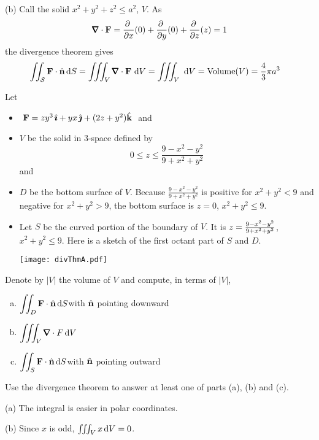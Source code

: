 \begin{solution}
(b) Call the solid $x^2+y^2+z^2\le a^2$, $V$.
As
\begin{equation*}
\vnabla\cdot\vF
=\pdiff{}{x}(0)
+\pdiff{}{y}(0)
+\pdiff{}{z}(z)
=1
\end{equation*}
the divergence theorem gives
\begin{align*}
\dblInt_{\cS}\vF\cdot\hn\,\dee{S}
&=\tripInt_V\vnabla\cdot\vF\ \dee{V}
=\tripInt_V \ \dee{V}
=\text{Volume}(V)
=\frac{4}{3}\pi a^3
\end{align*}
\end{solution}

\begin{question}
 Let 
\begin{itemize}\itemsep1pt \parskip0pt  %
\item
$\ \vF=zy^3\,\hi+yx\, \hj+(2z+y^2)\hk\ $ and
\item
 $V$ be the solid in 3-space defined by
$$
0\le z\le \frac{9-x^2-y^2}{9+x^2+y^2}
$$
and
\item
$D$ be the bottom surface of $V$.
Because $\frac{9-x^2-y^2}{9+x^2+y^2}$ is positive for 
$x^2+y^2< 9$ and negative for $x^2+y^2> 9$,
the bottom surface is $z=0$, $x^2+y^2\le 9$.
\item
Let $S$ be the curved portion of the boundary of $V$.
It is $z={9-x^2-y^2\over 9+x^2+y^2}$, $x^2+y^2\le 9$.
Here is a sketch of the first octant part of $S$ and $D$.
\begin{center}
       \texttt{[image: divThmA.pdf]}
\end{center}
\end{itemize}
Denote by $|V|$ the volume of $V$ and compute, in terms of $|V|$,
\begin{enumerate}[(a)]
\item
$\displaystyle\iint_{D}\mathbf{F}\cdot \hat{\mathbf{n}}\,\mathrm{d}S$\quad\quad with $\hat{\mathbf{n}}$ pointing downward
\item
$\dst\tripInt_V\vnabla\cdot F\,\dee{V}$
\item
$\displaystyle\iint_S\mathbf{F}\cdot\hat{\mathbf{n}}\,\mathrm{d}S$\quad\quad with $\hat{\mathbf{n}}$ pointing outward
\end{enumerate}
Use the divergence theorem to answer at least one of parts (a), (b) and
(c).
\end{question}

\begin{hint} 
(a) The integral is easier in polar coordinates.

(b) Since $x$ is odd, $\iiint_V x\,\mathrm{d}V=0$.

\end{hint}

